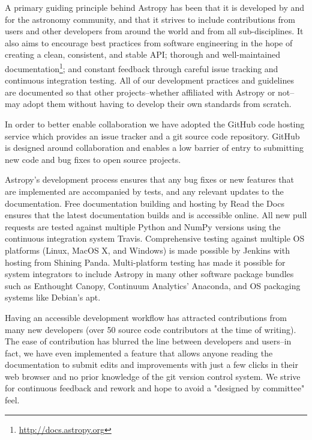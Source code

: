 \documentclass[11pt,twoside]{article}
\begin{document}
A primary guiding principle behind Astropy has been that it is developed by and
for the astronomy community, and that it strives to include contributions from
users and other developers from around the world and from all sub-disciplines.
It also aims to encourage best practices from software engineering in the hope
of creating a clean, consistent, and stable API; thorough and well-maintained
documentation\footnote{\url{http://docs.astropy.org}}; and constant feedback
through careful issue tracking and continuous integration testing.  All of our
development practices and guidelines are documented so that other
projects--whether affiliated with Astropy or not--may adopt them without having
to develop their own standards from scratch.

In order to better enable collaboration we have adopted the GitHub code hosting
service which provides an issue tracker and a git source code repository.
GitHub is designed around collaboration and enables a low barrier of entry to
submitting new code and bug fixes to open source projects.

Astropy's development process ensures that any bug fixes or new features that
are implemented are accompanied by tests, and any relevant updates to the
documentation.  Free documentation building and hosting by Read the Docs
ensures that the latest documentation builds and is accessible online.  All new
pull requests are tested against multiple Python and NumPy versions using the
continuous integration system Travis.  Comprehensive testing against multiple
OS platforms (Linux, MacOS X, and Windows) is made possible by Jenkins with
hosting from Shining Panda.  Multi-platform testing has made it possible for
system integrators to include Astropy in many other software package bundles
such as Enthought Canopy, Continuum Analytics' Anaconda, and OS packaging
systems like Debian's apt.

Having an accessible development workflow has attracted contributions from many
new developers (over 50 source code contributors at the time of writing).  The
ease of contribution has blurred the line between developers and users--in
fact, we have even implemented a feature that allows anyone reading the
documentation to submit edits and improvements with just a few clicks in their
web browser and no prior knowledge of the git version control system.  We
strive for continuous feedback and rework and hope to avoid a "designed by
committee" feel.


\end{document}

